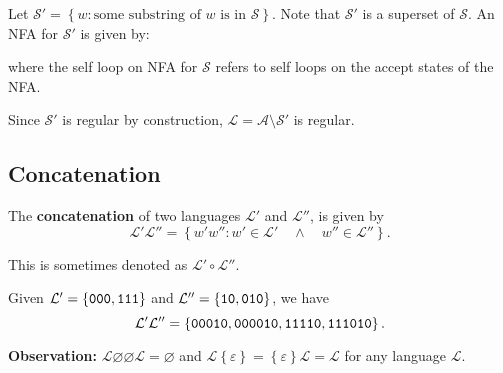 \documentclass{notes}
\begin{document}
\begin{prf}
  Let $\mathcal S' = \left \{ w : \text{some substring of $w$ is in $\mathcal S$} \right \}$.
  Note that $\mathcal S'$ is a superset of $\mathcal S$.
  An NFA for $\mathcal S'$ is given by: 
  
  \begin{center}
  \end{center}
  where the self loop on NFA for $\mathcal S$ refers to self loops on the accept states of the NFA.
  
  Since $\mathcal S'$ is regular by construction, $\mathcal L = \mathcal A \setminus \mathcal S'$ is regular.
\end{prf}

\subsection{Concatenation}

\begin{defn}
  The {\boldmath \bfseries concatenation} of two languages $\mathcal L'$ and $\mathcal L''$, is given by 
  \[
    \mathcal L' \mathcal L'' = \left \{ w' w'' : w' \in \mathcal L' \quad \land \quad w'' \in \mathcal L'' \right \}.
  \]
  
  This is sometimes denoted as $\mathcal L' \circ \mathcal L''$.
\end{defn}

\begin{eg}
  Given $\mathcal L' = \left \{ \verb~000~, \verb~111~ \right \}$ and $\mathcal L'' = \left \{ \verb~10~, \verb~010~ \right \}$, we have 
  \[
    \mathcal L' \mathcal L'' = \left \{ \verb~00010~, \verb~000010~, \verb~11110~, \verb~111010~ \right \}.
  \]
\end{eg}

{\boldmath \bfseries Observation: } $\mathcal L \varnothing \varnothing \mathcal L = \varnothing$ and $\mathcal L \left \{ \varepsilon \right \} = \left \{ \varepsilon \right \} \mathcal L = \mathcal L$ for any language $\mathcal L$.
\end{document}
